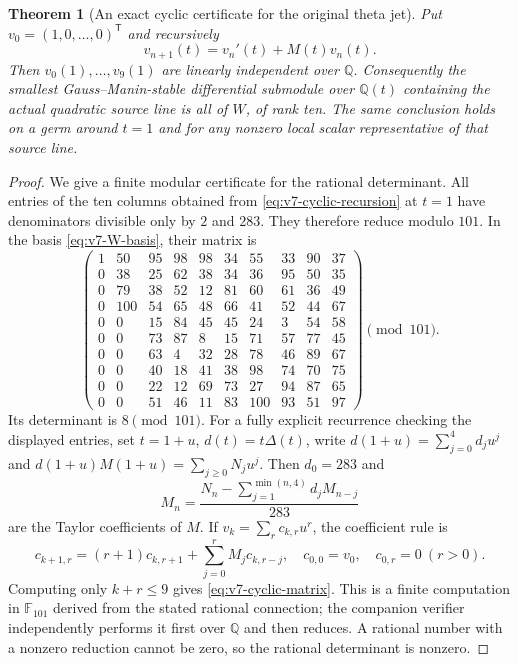 \documentclass[11pt]{article}
\newtheorem{theorem}{Theorem}[section]
\theoremstyle{definition}
\theoremstyle{remark}
\newcommand{\F}{\mathbb F}
\newcommand{\Q}{\mathbb Q}
\begin{document}
\begin{theorem}[An exact cyclic certificate for the original theta jet]
\label{thm:v7-rank10}
Put $v_0=(1,0,\ldots,0)^{\mathsf T}$ and recursively
\begin{equation}
 v_{n+1}(t)=v_n'(t)+M(t)v_n(t).
 \label{eq:v7-cyclic-recursion}
\end{equation}
Then $v_0(1),\ldots,v_9(1)$ are linearly independent over $\Q$.
Consequently the smallest Gauss--Manin-stable differential submodule over
$\Q(t)$ containing the actual quadratic source line is all of $W$, of rank
ten. The same conclusion holds on a germ around $t=1$ and for any nonzero
local scalar representative of that source line.
\end{theorem}
\begin{proof}
We give a finite modular certificate for the rational determinant. All entries
of the ten columns obtained from \eqref{eq:v7-cyclic-recursion} at $t=1$
have denominators divisible only by $2$ and $283$. They therefore reduce
modulo $101$. In the basis \eqref{eq:v7-W-basis}, their matrix is
\begin{equation}
\left(\begin{array}{rrrrrrrrrr}
1&50&95&98&98&34&55&33&90&37\\
0&38&25&62&38&34&36&95&50&35\\
0&79&38&52&12&81&60&61&36&49\\
0&100&54&65&48&66&41&52&44&67\\
0&0&15&84&45&45&24&3&54&58\\
0&0&73&87&8&15&71&57&77&45\\
0&0&63&4&32&28&78&46&89&67\\
0&0&40&18&41&38&98&74&70&75\\
0&0&22&12&69&73&27&94&87&65\\
0&0&51&46&11&83&100&93&51&97
\end{array}\right)\pmod{101}.
\label{eq:v7-cyclic-matrix}
\end{equation}
Its determinant is $8\pmod{101}$. For a fully explicit recurrence checking
the displayed entries, set $t=1+u$, $d(t)=t\Delta(t)$, write
$d(1+u)=\sum_{j=0}^4d_ju^j$ and
$d(1+u)M(1+u)=\sum_{j\ge0}N_ju^j$. Then $d_0=283$ and
\[
 M_n=\frac{N_n-\sum_{j=1}^{\min(n,4)}d_jM_{n-j}}{283}
\]
are the Taylor coefficients of $M$. If $v_k=\sum_r c_{k,r}u^r$, the
coefficient rule is
\begin{equation}
 c_{k+1,r}=(r+1)c_{k,r+1}+\sum_{j=0}^rM_j c_{k,r-j},
 \quad c_{0,0}=v_0,\quad c_{0,r}=0\ (r>0).
 \label{eq:v7-Taylor-recursion}
\end{equation}
Computing only $k+r\le9$ gives \eqref{eq:v7-cyclic-matrix}. This is a
finite computation in $\F_{101}$ derived from the stated rational connection;
the companion verifier independently performs it first over $\Q$ and then
reduces. A rational number with a nonzero reduction cannot be zero, so the
rational determinant is nonzero.


\end{proof}
\end{document}
